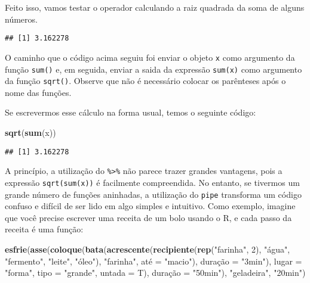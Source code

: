 \documentclass[]{book}
\newenvironment{Shaded}{\begin{snugshade}}{\end{snugshade}}
\newcommand{\KeywordTok}[1]{\textcolor[rgb]{0.13,0.29,0.53}{\textbf{{#1}}}}
\newcommand{\DataTypeTok}[1]{\textcolor[rgb]{0.13,0.29,0.53}{{#1}}}
\newcommand{\DecValTok}[1]{\textcolor[rgb]{0.00,0.00,0.81}{{#1}}}
\newcommand{\StringTok}[1]{\textcolor[rgb]{0.31,0.60,0.02}{{#1}}}
\newcommand{\NormalTok}[1]{{#1}}
\begin{document}
Feito isso, vamos testar o operador calculando a raiz quadrada da soma
de alguns números.

\begin{Shaded}
\end{Shaded}

\begin{verbatim}
## [1] 3.162278
\end{verbatim}

O caminho que o código acima seguiu foi enviar o objeto \texttt{x} como
argumento da função \texttt{sum()} e, em seguida, enviar a saida da
expressão \texttt{sum(x)} como argumento da função \texttt{sqrt()}.
Observe que não é necessário colocar os parênteses após o nome das
funções.

Se escrevermos esse cálculo na forma usual, temos o seguinte código:

\begin{Shaded}
\begin{Highlighting}[]
\KeywordTok{sqrt}\NormalTok{(}\KeywordTok{sum}\NormalTok{(x))}
\end{Highlighting}
\end{Shaded}

\begin{verbatim}
## [1] 3.162278
\end{verbatim}

A princípio, a utilização do \texttt{\%\textgreater{}\%} não parece
trazer grandes vantagens, pois a expressão \texttt{sqrt(sum(x))} é
facilmente compreendida. No entanto, se tivermos um grande número de
funções aninhadas, a utilização do \texttt{pipe} transforma um código
confuso e difícil de ser lido em algo simples e intuitivo. Como exemplo,
imagine que você precise escrever uma receita de um bolo usando o R, e
cada passo da receita é uma função:

\begin{Shaded}
\begin{Highlighting}[]
\KeywordTok{esfrie}\NormalTok{(}\KeywordTok{asse}\NormalTok{(}\KeywordTok{coloque}\NormalTok{(}\KeywordTok{bata}\NormalTok{(}\KeywordTok{acrescente}\NormalTok{(}\KeywordTok{recipiente}\NormalTok{(}\KeywordTok{rep}\NormalTok{(}\StringTok{"farinha"}\NormalTok{, }\DecValTok{2}\NormalTok{), }\StringTok{"água"}\NormalTok{, }\StringTok{"fermento"}\NormalTok{, }\StringTok{"leite"}\NormalTok{, }\StringTok{"óleo"}\NormalTok{), }\StringTok{"farinha"}\NormalTok{, até =}\StringTok{ "macio"}\NormalTok{), duraçã}\DataTypeTok{o =} \StringTok{"3min"}\NormalTok{), }\DataTypeTok{lugar =} \StringTok{"forma"}\NormalTok{, }\DataTypeTok{tipo =} \StringTok{"grande"}\NormalTok{, }\DataTypeTok{untada =} \NormalTok{T), duraçã}\DataTypeTok{o =} \StringTok{"50min"}\NormalTok{), }\StringTok{"geladeira"}\NormalTok{, }\StringTok{"20min"}\NormalTok{)}
\end{Highlighting}
\end{Shaded}
\end{document}
